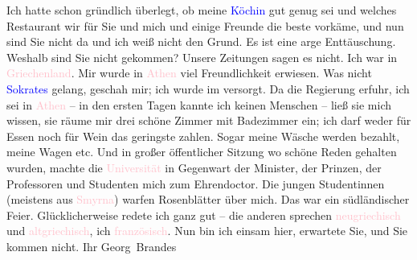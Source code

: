                Ich hatte schon gründlich überlegt, ob meine \textcolor{blue}{Köchin}{} gut genug sei und welches Restaurant wir für Sie und
               mich und einige Freunde die beste vorkäme, und nun sind Sie nicht da und ich weiß
               nicht den Grund. Es ist eine arge Enttäuschung. Weshalb sind Sie nicht gekommen?
               Unsere Zeitungen sagen es nicht.\pend
           \pstart
           Ich war in \textcolor{pink}{Griechenland}{}\ledrightnote{\textcolor{pink}{Griechenland}}. Mir wurde in \textcolor{pink}{Athen}{}\ledrightnote{\textcolor{pink}{Athen}} viel Freundlichkeit erwiesen. Was nicht \textcolor{blue}{Sokrates}{}\ledrightnote{\textcolor{blue}{Sokrates}} gelang, geschah mir; ich wurde im \label{K_L02383_2v}\label{K_L02383_2h} versorgt. Da die Regierung erfuhr,
               ich sei in \textcolor{pink}{Athen}{}\ledrightnote{\textcolor{pink}{Athen}} – in den ersten Tagen kannte ich
               keinen Menschen – ließ sie mich wissen, sie räume mir drei schöne Zimmer mit
               Badezimmer ein; ich darf weder für Essen noch für Wein das geringste zahlen. Sogar
               meine Wäsche werden bezahlt, meine Wagen etc. Und in großer öffentlicher Sitzung wo
               schöne Reden gehalten wurden, machte die \textcolor{pink}{Universität}{}\ledrightnote{\textcolor{pink}{Nationale und Kapodistrias-Universität Athen}} in Gegenwart der Minister, der Prinzen, der Professoren und
               Studenten mich zum Ehrendoctor. Die jungen Studentinnen (meistens aus \textcolor{pink}{Smyrna}{}\ledrightnote{\textcolor{pink}{Izmir}}) warfen Rosenblätter über mich. Das war ein
               südländischer Feier. Glücklicherweise redete ich ganz gut – die anderen
               sprechen \textcolor{pink}{neugriechisch}{}\ledrightnote{\textcolor{pink}{Griechenland}} und \textcolor{pink}{altgriechisch}{}\ledrightnote{\textcolor{pink}{Griechenland}}, ich \textcolor{pink}{französisch}{}\ledrightnote{\textcolor{pink}{Frankreich}}.\pend
           \pstart
           Nun bin ich einsam hier, erwartete Sie, und Sie kommen nicht.\pend
           \pstart Ihr \spacefill\mbox{Georg Brandes}\pend{}\endnumbering{}  
      